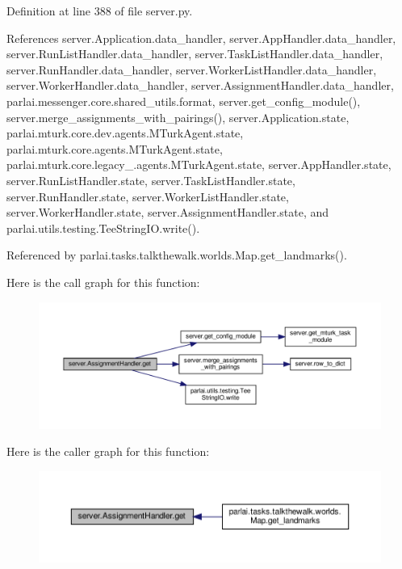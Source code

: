 Definition at line 388 of file server.\+py.



References server.\+Application.\+data\+\_\+handler, server.\+App\+Handler.\+data\+\_\+handler, server.\+Run\+List\+Handler.\+data\+\_\+handler, server.\+Task\+List\+Handler.\+data\+\_\+handler, server.\+Run\+Handler.\+data\+\_\+handler, server.\+Worker\+List\+Handler.\+data\+\_\+handler, server.\+Worker\+Handler.\+data\+\_\+handler, server.\+Assignment\+Handler.\+data\+\_\+handler, parlai.\+messenger.\+core.\+shared\+\_\+utils.\+format, server.\+get\+\_\+config\+\_\+module(), server.\+merge\+\_\+assignments\+\_\+with\+\_\+pairings(), server.\+Application.\+state, parlai.\+mturk.\+core.\+dev.\+agents.\+M\+Turk\+Agent.\+state, parlai.\+mturk.\+core.\+agents.\+M\+Turk\+Agent.\+state, parlai.\+mturk.\+core.\+legacy\+\_.\+agents.\+M\+Turk\+Agent.\+state, server.\+App\+Handler.\+state, server.\+Run\+List\+Handler.\+state, server.\+Task\+List\+Handler.\+state, server.\+Run\+Handler.\+state, server.\+Worker\+List\+Handler.\+state, server.\+Worker\+Handler.\+state, server.\+Assignment\+Handler.\+state, and parlai.\+utils.\+testing.\+Tee\+String\+I\+O.\+write().



Referenced by parlai.\+tasks.\+talkthewalk.\+worlds.\+Map.\+get\+\_\+landmarks().

Here is the call graph for this function\+:
\nopagebreak
\begin{figure}[H]
\begin{center}
\leavevmode
\includegraphics[width=350pt]{classserver_1_1AssignmentHandler_aafff6382132dfeb120d0fd1889ab079c_cgraph}
\end{center}
\end{figure}
Here is the caller graph for this function\+:
\nopagebreak
\begin{figure}[H]
\begin{center}
\leavevmode
\includegraphics[width=350pt]{classserver_1_1AssignmentHandler_aafff6382132dfeb120d0fd1889ab079c_icgraph}
\end{center}
\end{figure}
\mbox{\label{classserver_1_1AssignmentHandler_a82430f14db86bf0a25245349bdec13b2}} 
